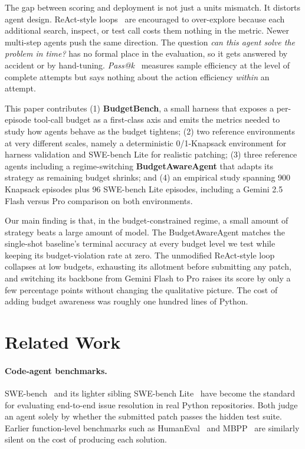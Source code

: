 \documentclass[11pt]{article}
\begin{document}
The gap between scoring and deployment is not just a units mismatch. It
distorts agent design. ReAct-style loops~\cite{yao2023react} are encouraged
to over-explore because each additional search, inspect, or test call
costs them nothing in the metric. Newer multi-step agents push the same
direction. The question \emph{can this agent solve the problem in time?}
has no formal place in the evaluation, so it gets answered by accident
or by hand-tuning. \emph{Pass@k}~\cite{chen2021codex} measures sample
efficiency at the level of complete attempts but says nothing about the
action efficiency \emph{within} an attempt.

This paper contributes (1) \textbf{BudgetBench}, a small harness that
exposes a per-episode tool-call budget as a first-class axis and emits
the metrics needed to study how agents behave as the budget tightens;
(2) two reference environments at very different scales, namely a
deterministic 0/1-Knapsack environment for harness validation and
SWE-bench Lite for realistic patching; (3) three reference agents
including a regime-switching \textbf{BudgetAwareAgent} that adapts its
strategy as remaining budget shrinks; and (4) an empirical study
spanning 900 Knapsack episodes plus 96 SWE-bench Lite episodes,
including a Gemini 2.5 Flash versus Pro comparison on both
environments.

Our main finding is that, in the budget-constrained regime, a small
amount of strategy beats a large amount of model. The BudgetAwareAgent
matches the single-shot baseline's terminal accuracy at every budget
level we test while keeping its budget-violation rate at zero. The
unmodified ReAct-style loop collapses at low budgets, exhausting its
allotment before submitting any patch, and switching its backbone from
Gemini Flash to Pro raises its score by only a few percentage points
without changing the qualitative picture. The cost of adding budget
awareness was roughly one hundred lines of Python.

\section{Related Work}
\label{sec:related}

\paragraph{Code-agent benchmarks.}
SWE-bench~\cite{jimenez2024swebench} and its lighter sibling SWE-bench
Lite~\cite{swebenchlite2024} have become the standard for evaluating
end-to-end issue resolution in real Python repositories. Both judge an
agent solely by whether the submitted patch passes the hidden test suite.
Earlier function-level benchmarks such as HumanEval~\cite{chen2021codex}
and MBPP~\cite{austin2021mbpp} are similarly silent on the cost of producing
each solution.
\end{document}

